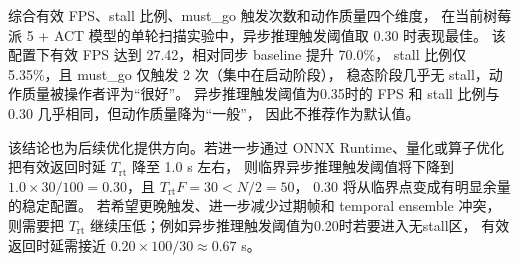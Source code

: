 综合有效 FPS、stall 比例、must\_go 触发次数和动作质量四个维度，
在当前树莓派 5 + ACT 模型的单轮扫描实验中，异步推理触发阈值取 0.30 时表现最佳。
该配置下有效 FPS 达到 27.42，相对同步 baseline 提升 70.0\%，
stall 比例仅 5.35\%，且 must\_go 仅触发 2 次（集中在启动阶段），
稳态阶段几乎无 stall，动作质量被操作者评为“很好”。
异步推理触发阈值为0.35时的 FPS 和 stall 比例与 0.30 几乎相同，但动作质量降为“一般”，
因此不推荐作为默认值。

该结论也为后续优化提供方向。若进一步通过 ONNX Runtime、量化或算子优化
把有效返回时延 $T_{\text{rt}}$ 降至 1.0 s 左右，
则临界异步推理触发阈值将下降到
$1.0\times30/100=0.30$，且 $T_{\text{rt}}F=30 < N/2=50$，
0.30 将从临界点变成有明显余量的稳定配置。
若希望更晚触发、进一步减少过期帧和 temporal ensemble 冲突，
则需要把 $T_{\text{rt}}$ 继续压低；例如异步推理触发阈值为0.20时若要进入无stall区，
有效返回时延需接近 $0.20\times100/30\approx0.67$ s。
